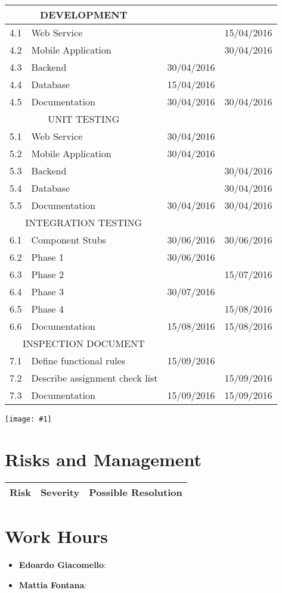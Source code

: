 \documentclass[11pt, a4paper,titlepage]{article}
\newcommand{\image}[1]{
	\begin{center}
		\noindent \texttt{[image: \#1]}
	\end{center}
}
\begin{document}
			\begin{tabularx}{\textwidth}{|l|X|c|c|}
				\hline
		\multicolumn{2}{c}{DEVELOPMENT}	 &  & \\
		\hline
		4.1 & 	Web Service &   & 15/04/2016 \\
		4.2 & 	Mobile Application &   & 30/04/2016 \\
		4.3 & 	Backend & 30/04/2016  &  \\
		4.4 & 	Database & 15/04/2016  &  \\
		4.5 & 	Documentation & 30/04/2016  & 30/04/2016 \\
		\hline
		\multicolumn{2}{c}{UNIT TESTING} &  & \\
		\hline
		5.1 & 	Web Service & 30/04/2016  &  \\
		5.2 & 	Mobile Application & 30/04/2016  &  \\
		5.3 & 	Backend &   & 30/04/2016 \\
		5.4 & 	Database &   & 30/04/2016 \\
		5.5 & 	Documentation & 30/04/2016  & 30/04/2016 \\
		\hline
		\multicolumn{2}{c}{INTEGRATION TESTING}	 &  & \\
		\hline
		6.1 & 	Component Stubs & 30/06/2016  & 30/06/2016 \\
		6.2 & 	Phase 1 & 30/06/2016  &  \\
		6.3 & 	Phase 2 &   & 15/07/2016 \\
		6.4 & 	Phase 3 & 30/07/2016 &  \\
		6.5 & 	Phase 4 &   & 15/08/2016 \\
		6.6 & 	Documentation & 15/08/2016 & 15/08/2016 \\
		\hline
		\multicolumn{2}{c}{INSPECTION DOCUMENT} &  & \\
		\hline
		7.1 & 	Define functional rules & 15/09/2016 &  \\
		7.2 & 	Describe assignment check list &   & 15/09/2016 \\
		7.3 & 	Documentation & 15/09/2016 & 15/09/2016 \\
		\hline
	\end{tabularx}
	\newline
	\image{ganttdiagramm.png}
	\newpage
	
	\section{Risks and Management}
		\begin{tabularx}{\textwidth}{|X|l|X|}
			\hline
			\textbf{Risk} &	\textbf{Severity} & \textbf{Possible Resolution} \\
			\hline
	\end{tabularx}

	\section{Work Hours}
		\begin{itemize}
			\item \textbf{Edoardo Giacomello}: 
			\item \textbf{Mattia Fontana}: 
		\end{itemize}	
\end{document}
